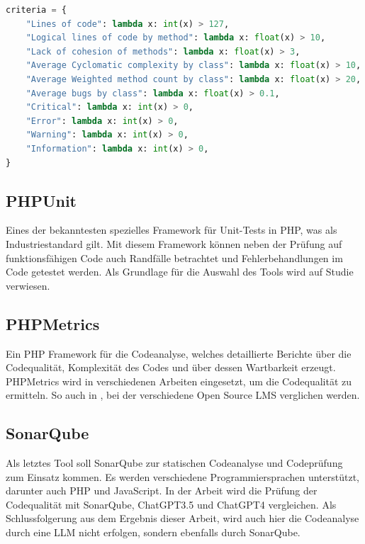\begin{lstlisting}[language=python,caption={Beispiel für Bewertungskriterien},label=lst:phpmetric_criteria_example]
criteria = {
    "Lines of code": lambda x: int(x) > 127,
    "Logical lines of code by method": lambda x: float(x) > 10,
    "Lack of cohesion of methods": lambda x: float(x) > 3,
    "Average Cyclomatic complexity by class": lambda x: float(x) > 10,
    "Average Weighted method count by class": lambda x: float(x) > 20,
    "Average bugs by class": lambda x: float(x) > 0.1,
    "Critical": lambda x: int(x) > 0,
    "Error": lambda x: int(x) > 0,
    "Warning": lambda x: int(x) > 0,
    "Information": lambda x: int(x) > 0,
}
\end{lstlisting}

\subsection{PHPUnit}
Eines der bekanntesten spezielles Framework für Unit-Tests in PHP, was als Industriestandard gilt. Mit diesem Framework können neben der Prüfung auf funktionsfähigen Code auch Randfälle betrachtet und Fehlerbehandlungen im Code getestet werden. Als Grundlage für die Auswahl des Tools wird auf Studie \cite{mohamad-2016} verwiesen.

\subsection{PHPMetrics}
Ein PHP Framework für die Codeanalyse, welches detaillierte Berichte über die Codequalität, Komplexität des Codes und über dessen Wartbarkeit erzeugt. PHPMetrics wird in verschiedenen Arbeiten eingesetzt, um die Codequalität zu ermitteln. So auch in \cite{anggrain-2016}, bei der verschiedene Open Source LMS verglichen werden.

\subsection{SonarQube}
Als letztes Tool soll SonarQube zur statischen Codeanalyse und Codeprüfung zum Einsatz kommen. Es werden verschiedene Programmiersprachen unterstützt, darunter auch PHP und JavaScript. In der Arbeit \cite{da-silva-simoes-2024} wird die Prüfung der Codequalität mit SonarQube, ChatGPT3.5 und ChatGPT4 vergleichen. Als Schlussfolgerung aus dem Ergebnis dieser Arbeit, wird auch hier die Codeanalyse durch eine LLM nicht erfolgen, sondern ebenfalls durch SonarQube.

